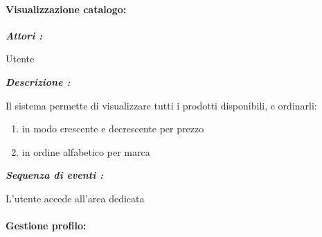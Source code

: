 \documentclass{article}
\begin{document}
\newpage
\paragraph{Visualizzazione catalogo:}

\begin{mdframed}
	\noindent\textit{\textbf{Attori :}}


	Utente

	\noindent\textit{\textbf{Descrizione :}}


	Il sistema permette di visualizzare tutti i prodotti disponibili, e ordinarli:
	\begin{enumerate}
		\item in modo crescente e decrescente per prezzo
		\item in ordine alfabetico per marca
	\end{enumerate}

	\noindent\textit{\textbf{Sequenza di eventi :}}


	L’utente accede all'area dedicata

\end{mdframed}

\paragraph{Gestione profilo:}
\end{document}

